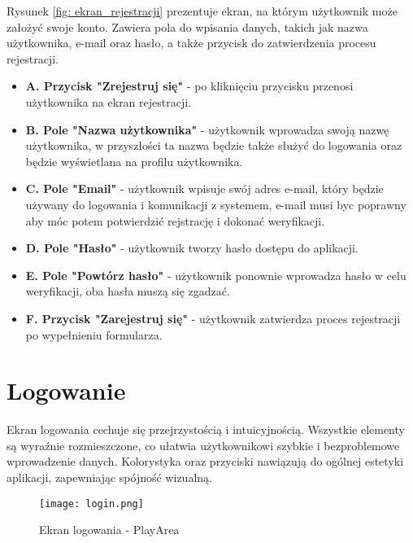 \documentclass[wmii,inf,inz]{uwmthesis} %
\begin{document}
\noindent
\noindent Rysunek \ref{fig: ekran_rejestracji} prezentuje ekran, na którym użytkownik może założyć swoje konto. Zawiera pola do wpisania danych, takich jak nazwa użytkownika, e-mail oraz hasło, a także przycisk do zatwierdzenia procesu rejestracji.
\begin{itemize}
    \item \textbf{A. Przycisk "Zrejestruj się"} - po kliknięciu przycisku przenosi użytkownika na ekran rejestracji.
    \item \textbf{B. Pole "Nazwa użytkownika"} - użytkownik wprowadza swoją nazwę użytkownika, w przyszłości ta nazwa będzie także służyć do logowania oraz będzie wyświetlana na profilu użytkownika.
    \item \textbf{C. Pole "Email"} - użytkownik wpisuje swój adres e-mail, który będzie używany do logowania i komunikacji z systemem, e-mail musi byc poprawny aby móc potem potwierdzić rejstrację i dokonać weryfikacji.
    \item \textbf{D. Pole "Hasło"} - użytkownik tworzy hasło dostępu do aplikacji.
    \item \textbf{E. Pole "Powtórz hasło"} - użytkownik ponownie wprowadza hasło w celu weryfikacji, oba hasła muszą się zgadzać.
    \item \textbf{F. Przycisk "Zarejestruj się"} - użytkownik zatwierdza proces rejestracji po wypełnieniu formularza.
\end{itemize}

\section{Logowanie}

\noindent
Ekran logowania cechuje się przejrzystością i intuicyjnością. Wszystkie elementy są wyraźnie rozmieszczone, co ułatwia użytkownikowi szybkie i bezproblemowe wprowadzenie danych. Kolorystyka oraz przyciski nawiązują do ogólnej estetyki aplikacji, zapewniając spójność wizualną.\newline
\begin{figure}[H]
    \centering
    \texttt{[image: login.png]}
    \caption{Ekran logowania - PlayArea}
    \label{fig: ekran_logowania}
\end{figure}
\end{document}

